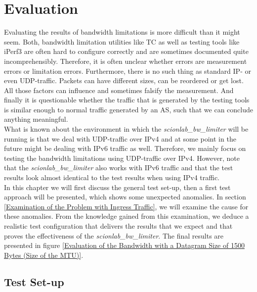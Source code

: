 \chapter{Evaluation}

Evaluating the results of bandwidth limitations is more difficult than it might seem. Both, bandwidth limitation utilities like \acs{TC} as well as testing tools like iPerf3 are often hard to configure correctly and are sometimes documented quite incomprehensibly. Therefore, it is often unclear whether errors are measurement errors or limitation errors. Furthermore, there is no such thing as standard \acs{IP}- or even \ac{UDP}-traffic. Packets can have different sizes, can be reordered or get lost. All those factors can influence and sometimes falsify the measurement. And finally it is questionable whether the traffic that is generated by the testing tools is similar enough to normal traffic generated by an \acs{AS}, such that we can conclude anything meaningful.
\\
What is known about the environment in which the \textit{scionlab\_bw\_limiter} will be running is that we deal with \acs{UDP}-traffic over \acs{IP}v4 and at some point in the future might be dealing with \acs{IP}v6 traffic as well. Therefore, we mainly focus on testing the bandwidth limitations using \acs{UDP}-traffic over \acs{IP}v4. However, note that the \textit{scionlab\_bw\_limiter} also works with \acs{IP}v6 traffic and that the test results look almost identical to the test results when using \acs{IP}v4 traffic.
\\
In this chapter we will first discuss the general test set-up, then a first test approach will be presented, which shows some unexpected anomalies. In section \ref{Examination of the Problem with Ingress Traffic}, we will examine the cause for these anomalies. From the  knowledge gained from this examination, we deduce a realistic test configuration that delivers the results that we expect and that proves the effectiveness of the \textit{scionlab\_bw\_limiter}. The final results are presented in figure \ref{Evaluation of the Bandwidth with a Datagram Size of 1500 Bytes (Size of the MTU)}.

\newpage

\section{Test Set-up}

